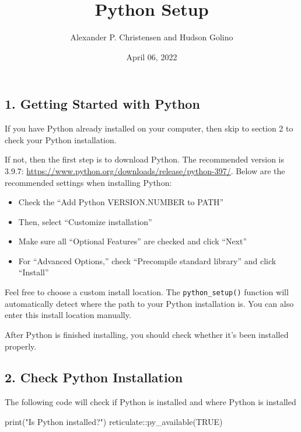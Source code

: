 \documentclass[
]{article}
\title{Python Setup}
\author{Alexander P. Christensen and Hudson Golino}
\date{April 06, 2022}
\newenvironment{Shaded}{\begin{snugshade}}{\end{snugshade}}
\newcommand{\ConstantTok}[1]{\textcolor[rgb]{0.00,0.00,0.00}{#1}}
\newcommand{\FunctionTok}[1]{\textcolor[rgb]{0.00,0.00,0.00}{#1}}
\newcommand{\NormalTok}[1]{#1}
\newcommand{\SpecialCharTok}[1]{\textcolor[rgb]{0.00,0.00,0.00}{#1}}
\newcommand{\StringTok}[1]{\textcolor[rgb]{0.31,0.60,0.02}{#1}}
\begin{document}
\maketitle

\hypertarget{section_1}{%
\subsection{1. Getting Started with Python}\label{section_1}}

If you have Python already installed on your computer, then skip to
section 2 to check your Python installation.

If not, then the first step is to download Python. The recommended
version is 3.9.7:
\url{https://www.python.org/downloads/release/python-397/}. Below are
the recommended settings when installing Python:

\begin{itemize}
\item
  Check the ``Add Python VERSION.NUMBER to PATH''
\item
  Then, select ``Customize installation''
\item
  Make sure all ``Optional Features'' are checked and click ``Next''
\item
  For ``Advanced Options,'' check ``Precompile standard library'' and
  click ``Install''
\end{itemize}

Feel free to choose a custom install location. The
\texttt{python\_setup()} function will automatically detect where the
path to your Python installation is. You can also enter this install
location manually.

After Python is finished installing, you should check whether it's been
installed properly.

\hypertarget{check-python-installation}{%
\subsection{2. Check Python
Installation}\label{check-python-installation}}

The following code will check if Python is installed and where Python is
installed

\begin{Shaded}
\begin{Highlighting}[]
\FunctionTok{print}\NormalTok{(}\StringTok{"Is Python installed?"}\NormalTok{)}
\NormalTok{reticulate}\SpecialCharTok{::}\FunctionTok{py\_available}\NormalTok{(}\ConstantTok{TRUE}\NormalTok{)}
\end{Highlighting}
\end{Shaded}
\end{document}
